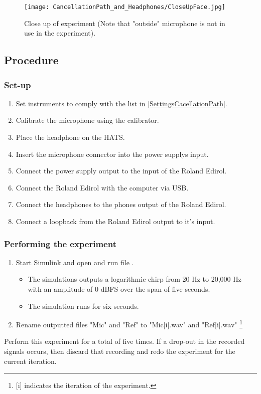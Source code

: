 \begin{figure}[H]
	\centering
	\texttt{[image: CancellationPath\_and\_Headphones/CloseUpFace.jpg]}
	\caption{Close up of experiment (Note that "outside" microphone is not in use in the experiment).}
	\label{CloseUpCancellationPath}
\end{figure}

\subsection{Procedure}
\subsubsection{Set-up}
\begin{enumerate}
	\item Set instruments to comply with the list in \ref{SettingsCacellationPath}.
	\item Calibrate the microphone using the calibrator. 
	\item Place the headphone on the HATS.
	\item Insert the microphone connector into the power supplys input.
	\item Connect the power supply output to the input of the Roland Edirol.
	\item Connect the Roland Edirol with the computer via USB.
	\item Connect the headphones to the phones output of the Roland Edirol.
	\item Connect a loopback from the Roland Edirol output to it's input.
\end{enumerate}

\subsubsection{Performing the experiment}
\begin{enumerate}
	\item Start Simulink\textsuperscript{\textregistered} and open and run file .
	\begin{itemize} 
		\item The simulations outputs a logarithmic chirp from 20 Hz to 20,000 Hz with an amplitude of 0 dBFS over the span of five seconds.
		\item The simulation runs for six seconds.
	\end{itemize}
	\item Rename outputted files "Mic" and "Ref" to "Mic[i].wav" and "Ref[i].wav" \footnote{[i] indicates the iteration of the experiment.}
\end{enumerate}
Perform this experiment for a total of five times. If  a drop-out in the recorded signals occurs, then discard that recording and redo the experiment for the current iteration. 


